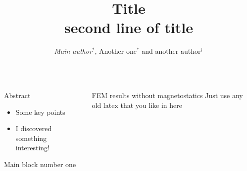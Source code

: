 \documentclass[final]{beamer} %
\title{Title \\ \vspace{0.3em} second line of title}
\author{
  \textit{Main author}$^*$, Another one$^*$ and another author$^\dagger$}
\institute{$*$ A University, Somewhere \\
  $\dagger$ Somewhere else}
\newlength{\columnheight}
\begin{document}


\begin{frame}
  \begin{columns}

    \begin{column}{0.47\textwidth}

      \parbox[t][\columnheight]{\textwidth}{

        \vfill %

        \begin{block}{Abstract}
          \begin{itshape}   %
              \begin{itemize}
              \item Some key points
              \item I discovered something interesting!
              \end{itemize}
            \end{itshape}
        \end{block}

        \vfill

        \begin{block}{\boxnumber Main block number one}
        \end{block}

        \vfill

      } %
    \end{column}

    \begin{column}{0.47\textwidth}
      \parbox[t][\columnheight]{\textwidth}{

        \vfill

        \begin{block}{\boxnumber FEM results without magnetostatics}
          Just use any old latex that you like in here
        \end{block}

        \vfill

      } %
    \end{column}

  \end{columns}
\end{frame}
\end{document}
